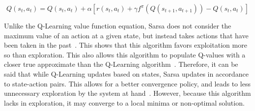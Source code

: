 \documentclass[12pt,american]{report}
\begin{document}
        \begin{equation}
            \label{eq:Sarsa value function}
            Q(s_{t},a_{t}) = Q(s_{t},a_{t}) + \alpha[r(s_{t},a_{t}) + \gamma f^{\pi}(Q(s_{t+1},a_{t+1}))-Q(s_{t},a_{t})]
        \end{equation}
        
        Unlike the Q-Learning value function equation, Sarsa does not consider the maximum value of an action at a given state, but instead takes actions that have been taken in the past~\cite{Eden}. This shows that this algorithm favors exploitation more so than exploration. This also allows this algorithm to populate Q-values with a closer true approximate than the Q-Learning algorithm~\cite{sprague2003multiple}. Therefore, it can be said that while Q-Learning updates based on states, Sarsa updates in accordance to state-action pairs.  This allows for a better convergence policy, and leads to less unnecessary exploration by the system at hand~\cite{sutton1996generalization}.  However, because this algorithm lacks in exploration, it may converge to a local minima or non-optimal solution.
        
\end{document}
